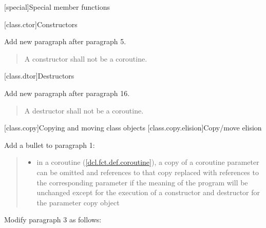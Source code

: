 
\begingroup
\renewcommand{\cleardoublepage}{}
\renewcommand{\clearpage}{}
[special]{Special member functions}
\endgroup

\setcounter{section}{0}
[class.ctor]{Constructors}%

Add new paragraph after paragraph 5.

	\setcounter{Paras}{5}
\begin{quote}
	\pnum A constructor shall not be a coroutine.
\end{quote}

\setcounter{section}{3}
[class.dtor]{Destructors}%

Add new paragraph after paragraph 16.

	\setcounter{Paras}{16}
\begin{quote}
	\pnum A destructor shall not be a coroutine.
\end{quote}

\pagebreak

\setcounter{section}{7}
[class.copy]{Copying and moving class objects}%
\setcounter{subsection}{2}
[class.copy.elision]{Copy/move elision}%

Add a bullet to paragraph 1:

\begin{quote}
\begin{itemize}
	\item in a coroutine (\ref{dcl.fct.def.coroutine}), a copy of a coroutine parameter  can be omitted
	and references to that copy replaced with references to the corresponding parameter if the meaning of the program will
	be unchanged except for the execution of a constructor and destructor for the parameter copy object
\end{itemize}
\end{quote} 

Modify paragraph 3 as follows:

